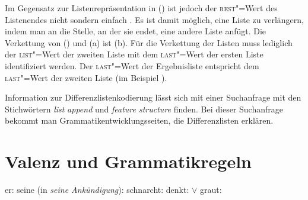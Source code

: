 \begin{enumerate}
Im Gegensatz zur
  Listenrepräsentation in () ist jedoch der \textsc{rest}"=Wert des Listenendes nicht 
  sondern einfach . Es ist damit möglich, eine Liste zu verlängern, indem man an die
  Stelle, an der sie endet, eine andere Liste anfügt. Die Verkettung von () und (a) ist (b).
\eal
\ex 
{}
\ex
{}
\zl
Für die Verkettung der Listen muss lediglich der \textsc{list}"=Wert der zweiten Liste mit dem \textsc{last}"=Wert der ersten Liste identifiziert werden. Der \textsc{last}"=Wert der Ergebnisliste
entspricht dem \textsc{last}"=Wert der zweiten Liste (im Beispiel ).

Information zur Differenzlistenkodierung lässt sich \zb mit einer Suchanfrage mit den Stichwörtern \emph{list} \emph{append} und
\emph{feature structure} finden. Bei dieser Suchanfrage bekommt man Grammatikentwicklungsseiten, die
Differenzlisten erklären.
\end{enumerate}



\section{Valenz und Grammatikregeln}

      \eal
      \ex er: \sliste{}
      \ex seine (in \emph{seine Ankündigung}): \sliste{}
      \ex schnarcht:  
      \ex denkt:  $\vee$ 
      \ex graut: 
      \zl


